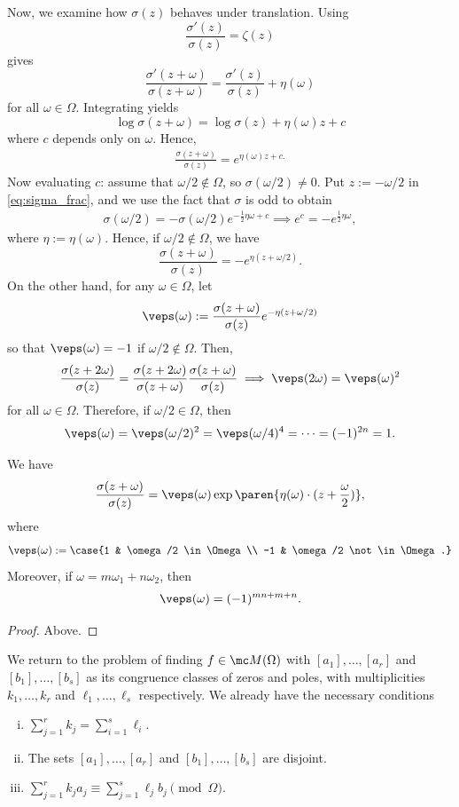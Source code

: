 \documentclass[11pt]{report}
\begin{document}
Now, we examine how $\sigma(z)$ behaves under translation. Using
$$\frac{\sigma'(z)}{\sigma(z)}=\zeta(z)$$
gives
$$\frac{\sigma'(z+\omega)}{\sigma(z+\omega)} = \frac{\sigma'(z)}{\sigma(z)} +\eta(\omega)$$
for all $\omega \in \Omega$. Integrating yields 
$$\log \sigma(z+\omega) = \log \sigma(z) + \eta(\omega)z  +c$$
where $c$ depends only on $\omega$. Hence,
\begin{align} \label{eq:sigma_frac}
    \frac{\sigma(z+\omega)}{\sigma(z)}=e^{\eta(\omega)z + c.}
\end{align}
Now evaluating $c$: assume that $\omega/2 \not \in \Omega$, so $\sigma(\omega/2) \neq 0$. Put $z:= -\omega/2$ in \eqref{eq:sigma_frac}, and we use the fact that $\sigma$ is odd to obtain
\begin{align*}
    \sigma(\omega/2) = -\sigma(\omega/2)e^{-\frac{1}{2}\eta\omega + c}\implies e^c = -e^{\frac{1}{2}\eta\omega},
\end{align*}
where $\eta:= \eta(\omega)$. Hence, if $\omega/2 \not \in \Omega$, we have
$$\frac{\sigma(z+\omega)}{\sigma(z)}=-e^{\eta (z+\omega/2)}.$$
On the other hand, for any $\omega \in \Omega$, let
$$\veps (\omega):= \frac{\sigma(z+\omega)}{\sigma(z)}e^{-\eta(z+\omega/2)}$$
so that $\veps(\omega)=-1$ if $\omega/2 \not \in \Omega$. Then,
\begin{align*}
    \frac{\sigma(z+2\omega)}{\sigma(z)}=\frac{\sigma(z+2\omega)}{\sigma (z+\omega)}\frac{\sigma(z+\omega)}{\sigma(z)} \implies \veps(2\omega) = \veps(\omega)^2
\end{align*}
for all $\omega \in \Omega$. Therefore, if $\omega/2 \in \Omega$, then
$$\veps(\omega) = \veps(\omega/2)^2 =\veps(\omega/4)^4 = \cdots = (-1)^{2n}=1.$$

\begin{thm}
    We have
    \begin{align*}
        \frac{\sigma(z+\omega)}{\sigma(z)}=\veps(\omega) \exp\paren{\eta (\omega)\cdot (z+\frac{\omega}{2})},
    \end{align*}
    where
    $$\veps(\omega) := \case{1 & \omega/2 \in \Omega \\ -1 & \omega/2 \not \in \Omega.}$$
    Moreover, if $\omega = m\omega_1 + n\omega_2$, then
    $$\veps(\omega ) = (-1)^{mn+m+n}.$$
\end{thm}

\begin{proof}
    Above.
\end{proof}

We return to the problem of finding $f \in \mc M(\Omega)$ with $[a_1],\dots,[a_r]$ and $[b_1],\dots,[b_s]$ as its congruence classes of zeros and poles, with multiplicities $k_1,\dots,k_r$ and $\ell_1,\dots,\ell_s$ respectively.  We already have the necessary conditions 
\begin{enumerate}[(i)]
    \item $\sum_{j=1}^r k_j = \sum_{i=1}^s \ell_i$.
    \item The sets $[a_1],\dots,[a_r]$ and $[b_1],\dots, [b_s]$ are disjoint.
    \item $\sum_{j=1}^rk_ja_j \equiv \sum_{j=1}^s \ell_jb_j \pmod \Omega$.
\end{enumerate}
\end{document}
